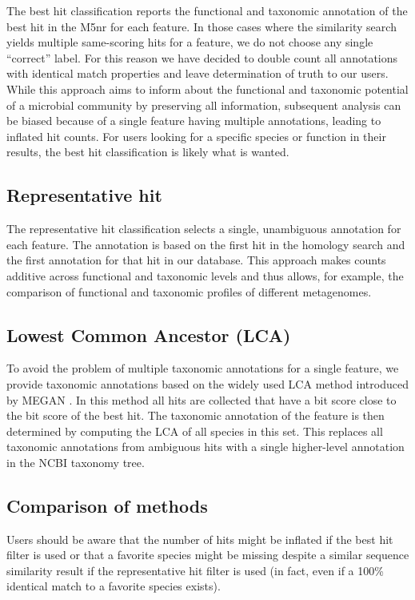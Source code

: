 \documentclass[12pt,fullpage]{report}
\begin{document}
The best hit classification reports the functional and taxonomic annotation of the best hit in the M5nr for each feature. In those cases where the similarity search yields multiple same-scoring hits for a feature, we do not choose any single ``correct'' label. For this reason we have decided to double count all annotations with identical match properties and leave determination of truth to our users. While this approach aims to inform about the functional and taxonomic potential of a microbial community by preserving all information, subsequent analysis can be biased because of a single feature having multiple annotations, leading to inflated hit counts. For users looking for a specific species or function in their results, the best hit classification is likely what is wanted.
\subsection*{Representative hit}

The representative hit classification selects a single, unambiguous annotation for each feature. The annotation is based on the first hit in the homology search and the first annotation for that hit in our database. This approach makes counts additive across functional and taxonomic levels and thus allows, for example, the comparison of functional and taxonomic profiles of different metagenomes.
\subsection*{Lowest Common Ancestor (LCA)}
\label{section:LCA}
To avoid the problem of multiple taxonomic annotations for a single feature, we provide taxonomic annotations based on the widely used LCA method introduced by MEGAN \cite{MEGAN}. In this method all hits are collected that have a bit score close to the bit score of the best hit. The taxonomic annotation of the feature is then determined by computing the LCA of all species in this set. This replaces all taxonomic annotations from ambiguous hits with a single higher-level annotation in the NCBI taxonomy tree.
\subsection*{Comparison of methods}
Users should be aware that the number of hits might be inflated if the best hit filter is used or that a favorite species might be missing despite a similar sequence similarity result if the representative hit filter is used (in fact, even if a 100\% identical match to a favorite species exists).
\end{document}

